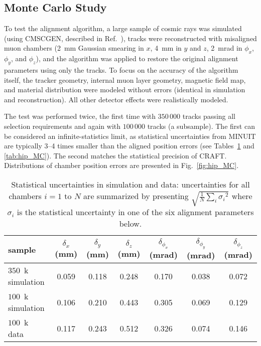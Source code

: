 \documentclass[11pt,twoside,a4paper,cmspaper]{cms-tdr}
\begin{document}
\subsection{Monte Carlo Study}
\label{sec:gmaresults}

To test the alignment algorithm, a large sample of cosmic rays was
simulated (using \mbox{CMSCGEN}, described in Ref.~\cite{Biallass:2009ev}),
tracks were reconstructed with misaligned muon chambers (2~mm Gaussian
smearing in $x$, 4~mm in $y$ and $z$, 2~mrad in $\phi_x$, $\phi_y$,
and $\phi_z$), and the algorithm was applied to restore the original
alignment parameters using only the tracks.  To focus on the accuracy
of the algorithm itself, the tracker geometry, internal muon layer
geometry, magnetic field map, and material distribution were modeled
without errors (identical in simulation and reconstruction).  All
other detector effects were realistically modeled.

The test was performed twice, the first time with $350\,000$ tracks
passing all selection requirements and again with $100\,000$ tracks (a
subsample).  The first can be considered an infinite-statistics limit,
as statistical uncertainties from MINUIT are typically 3--4 times
smaller than the aligned position errors (see
Tables~\ref{tab:staterrs} and \ref{tab:hip_MC}).  The second matches
the statistical precision of CRAFT.  Distributions of chamber position
errors are presented in Fig.~\ref{fig:hip_MC}.

\begin{table}[p]
\caption{Statistical uncertainties in simulation and data:
uncertainties for all chambers $i=1$ to $N$ are summarized by
presenting $\sqrt{\frac{1}{N} \sum_i {\sigma_i}^2}$ where $\sigma_i$
is the statistical uncertainty in one of the six alignment parameters
below. \label{tab:staterrs}}
\begin{center}
\renewcommand{\arraystretch}{1.5}
\begin{tabular}{l | c c c c c c}
\hline\hline sample & $\delta_x$ (mm) & $\delta_y$ (mm) & $\delta_z$ (mm) & $\delta_{\phi_x}$ (mrad) & $\delta_{\phi_y}$ (mrad) & $\delta_{\phi_z}$ (mrad) \\\hline
$350$~k simulation & 0.059 & 0.118 & 0.248 & 0.170 & 0.038 & 0.072 \\\hline
$100$~k simulation & 0.106 & 0.210 & 0.443 & 0.305 & 0.069 & 0.129 \\
$100$~k data & 0.117 & 0.243 & 0.512 & 0.326 & 0.074 & 0.146 \\\hline\hline
\end{tabular}
\end{center}
\end{table}
\end{document}
